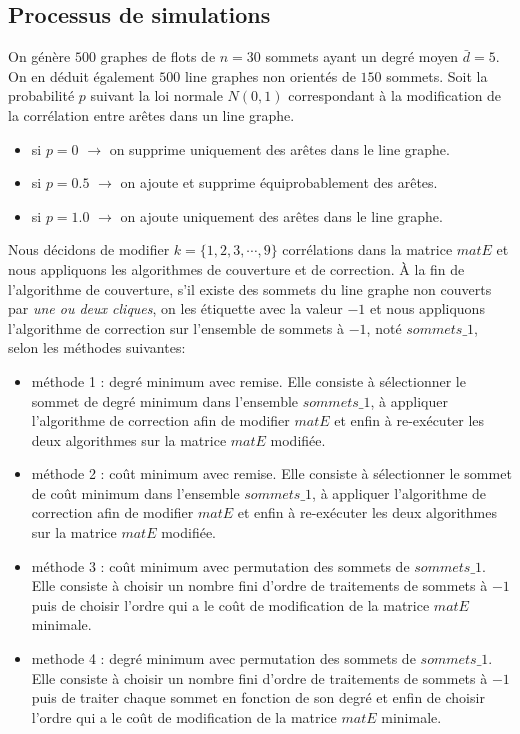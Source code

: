 \documentclass[onecolumn, 12pt]{book}
\begin{document}
\subsection{Processus de simulations}
On g\'en\`ere $500$ graphes de flots de $n = 30$ sommets ayant un degr\'e moyen $\bar d = 5$.
On en d\'eduit \'egalement $500$ line graphes non orient\'es  de $150$ sommets.
Soit la probabilit\'e $p$ suivant la loi normale $N(0,1)$ correspondant \`a la modification de la corr\'elation entre ar\^etes dans un line graphe.
\begin{itemize}
\item si $p=0$ $\rightarrow$ on supprime uniquement des ar\^etes dans le line graphe.
\item si $p=0.5$ $\rightarrow$ on ajoute et supprime \'equiprobablement des ar\^etes.
\item si $p=1.0$ $\rightarrow$ on ajoute uniquement des ar\^etes dans le line graphe.
\end{itemize}
Nous d\'ecidons de modifier $k = \{1,2,3,\cdots, 9\}$ corr\'elations dans la matrice $matE$ et nous appliquons les algorithmes de couverture et de correction.
\`A la fin de l'algorithme de couverture, s'il existe des sommets du line graphe non couverts par {\em une ou deux cliques}, on les \'etiquette avec la valeur $-1$ et nous appliquons l'algorithme  de correction sur l'ensemble de sommets \`a $-1$, not\'e $sommets\_1$, selon les m\'ethodes suivantes:
\begin{itemize}
\item m\'ethode 1 : degr\'e minimum avec remise.\newline
Elle consiste \`a s\'electionner le sommet de degr\'e minimum dans l'ensemble $sommets\_1$, \`a appliquer l'algorithme de correction afin de modifier $matE$ et enfin \`a re-ex\'ecuter les deux algorithmes sur la matrice $matE$ modifi\'ee.
\item m\'ethode 2 : co\^ut minimum avec remise. \newline
Elle consiste \`a s\'electionner le sommet de co\^ut minimum dans l'ensemble $sommets\_1$, \`a appliquer l'algorithme de correction afin de modifier $matE$ et enfin \`a re-ex\'ecuter les deux algorithmes sur la matrice $matE$ modifi\'ee.
\item m\'ethode 3 : co\^ut minimum avec permutation des sommets de $sommets\_1$. \newline
Elle consiste \`a choisir un nombre fini d'ordre de traitements de sommets \`a $-1$ puis de choisir l'ordre qui a le co\^ut de modification de la matrice $matE$ minimale.
\item methode 4 :  degr\'e minimum avec  permutation des sommets de $sommets\_1$. \newline
Elle consiste \`a choisir un nombre fini d'ordre de traitements de sommets \`a $-1$ puis de traiter chaque sommet en fonction de son degr\'e et enfin de choisir l'ordre qui a le co\^ut  de modification de la matrice $matE$ minimale.
\end{itemize}
\end{document}
